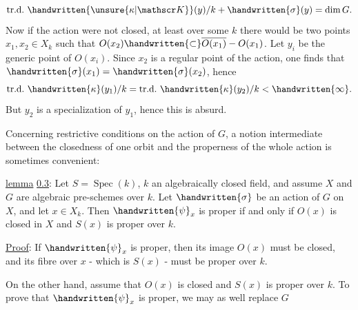 
\[
\mathrm{tr.d.}\ \handwritten{\unsure{\kappa|\mathscr K}}(y)/k+\handwritten{\sigma}(y)=\dim G.
\]
Now if the action were not closed, at least over some $k$ there would be two points $x_1,x_2\in X_k$ such that $O(x_2)\handwritten{\subset}\overline{O(x_1)}-O(x_1)$. Let $y_i$ be the generic point of $O(x_i)$. Since $x_2$ is a regular point of the action, one finds that $\handwritten{\sigma}(x_1)=\handwritten{\sigma}(x_2)$, hence
\[
\mathrm{tr.d.}\ \handwritten{\kappa}(y_1)/k=\mathrm{tr.d.}\ \handwritten{\kappa}(y_2)/k<\handwritten{\infty}.
\]
But $y_2$ is a specialization of $y_1$, hence this is absurd.

Concerning restrictive conditions on the action of $G$, a notion intermediate between the closedness of one orbit and the properness of the whole action is sometimes convenient:

\uline{lemma} \uline{0.3}: Let $S=\operatorname{Spec}(k)$, $k$ an algebraically closed field, and assume $X$ and $G$ are algebraic pre-schemes over $k$. Let $\handwritten{\sigma}$ be an action of $G$ on $X$, and let $x\in X_k$. Then $\handwritten{\psi}_x$ is proper if and only if $O(x)$ is closed in $X$ and $S(x)$ is proper over $k$.

\uline{Proof}: If $\handwritten{\psi}_x$ is proper, then its image $O(x)$ must be closed, and its fibre over $x$ - which is $S(x)$ - must be proper over $k$.

On the other hand, assume that $O(x)$ is closed and $S(x)$ is proper over $k$. To prove that $\handwritten{\psi}_x$ is proper, we may as well replace $G$

